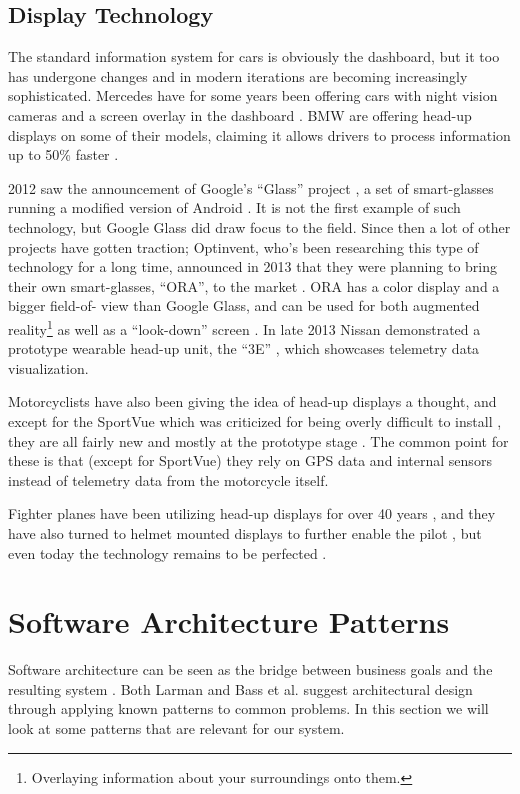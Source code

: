 \subsection{Display Technology}
The standard information system for cars is obviously the dashboard, but it too
has undergone changes and in modern iterations are becoming increasingly
sophisticated. Mercedes have for some years been offering cars with night
vision cameras and a screen overlay in the dashboard \cite{Daimler}. BMW are
offering head-up displays on some of their models, claiming it allows drivers
to process information up to 50\% faster \cite{BMW}.

2012 saw the announcement of Google's ``Glass'' project \cite{nytimes:glass}, a set of smart-glasses
running a modified version of Android \cite{androidnews:glassAndroid}. It is not the
first example of such technology, but Google Glass did draw focus to the field.
Since then a lot of other projects have gotten traction; Optinvent,
who's been researching this type of technology for a long time, announced in 
2013 that they were planning to bring their own smart-glasses, ``ORA'', to the
market \cite{optinvent:press}. ORA has a color display and a bigger field-of-
view than Google Glass, and can be used for both augmented reality\footnote{
	Overlaying information about your surroundings onto them. 
} as well as 
a ``look-down'' screen \cite{optinvent:ora}. In late 2013 Nissan 
demonstrated a prototype wearable head-up unit, the
``3E'' \cite{caranddriver:nissan_3E}, which showcases telemetry data
visualization.

Motorcyclists have also been giving the idea of head-up displays a thought, and
except for the SportVue \cite{motionResearch:sportvue} which was criticized for
being overly difficult to install \cite{bikeland:sportvueDidntWork}, they are
all fairly new and mostly at the prototype stage
 \cite{skully,cycleworld:nuviz,popularscience:livemap}. The common point for
these is that (except for SportVue) they rely on GPS data and internal sensors
instead of telemetry data from the motorcycle itself.

Fighter planes have been utilizing head-up displays for over 40 years
 \cite{debellis1973flight}, and they have also turned to
helmet mounted displays to further enable the pilot \cite{barnes:tacticalHud}, but even today the
technology remains to be perfected \cite{independent:blindedPilot}.

\section{Software Architecture Patterns}
Software architecture can be seen as the bridge between business goals and the resulting
system \cite{bass2012software}. Both Larman \cite{Larman:UML} and Bass et al.
 \cite{bass2012software} suggest architectural design through applying known
patterns to common problems. In this section we will look at some patterns 
that are relevant for our system.

